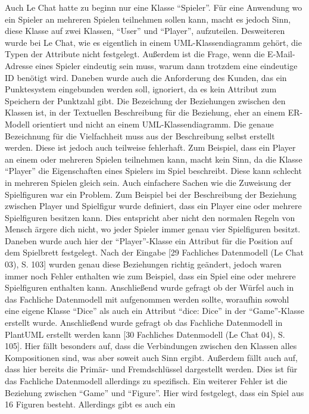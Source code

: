 Auch Le Chat hatte zu beginn nur eine Klasse ``Spieler''. Für eine Anwendung wo ein Spieler an mehreren Spielen teilnehmen sollen kann, macht es jedoch Sinn, diese 
Klasse auf zwei Klassen, ``User'' und ``Player'', aufzuteilen. Desweiteren wurde bei Le Chat, wie es eigentlich in einem UML-Klassendiagramm gehört, die Typen der
Attribute nicht festgelegt. Außerdem ist die Frage, wenn die E-Mail-Adresse eines Spieler eindeutig sein muss, warum dann trotzdem eine eindeutige ID benötigt wird.
Daneben wurde auch die Anforderung des Kunden, das ein Punktesystem eingebunden werden soll, ignoriert, da es kein Attribut zum Speichern der Punktzahl gibt.
Die Bezeichung der Beziehungen zwischen den Klassen ist, in der Textuellen Beschreibung für die Beziehung, eher an einem ER-Modell orientiert und nicht an einem 
UML-Klassendiagramm. Die genaue Bezeichnung für die Vielfachheit muss aus der Beschreibung selbst erstellt werden. Diese ist jedoch auch teilweise fehlerhaft. Zum 
Beispiel, dass ein Player an einem oder mehreren Spielen teilnehmen kann, macht kein Sinn, da die Klasse ``Player'' die Eigenschaften eines Spielers
im Spiel beschreibt. Diese kann schlecht in mehreren Spielen gleich sein. Auch einfachere Sachen wie die Zuweisung der Spielfiguren war ein Problem. Zum Beispiel bei 
der Beschreibung der Beziehung zwischen Player und Spielfigur wurde definiert, dass ein Player eine oder mehrere Spielfiguren besitzen kann. Dies entspricht aber nicht 
den normalen Regeln von Mensch ärgere dich nicht, wo jeder Spieler immer genau vier Spielfiguren besitzt. Daneben wurde auch hier der ``Player''-Klasse ein Attribut
für die Position auf dem Spielbrett festgelegt. Nach der Eingabe [29 Fachliches Datenmodell (Le Chat 03), S. 103] wurden genau diese Beziehungen 
richtig geändert, jedoch waren immer noch Fehler enthalten
wie zum Beispiel, dass ein Spiel eine oder mehrere Spielfiguren enthalten kann. Anschließend wurde gefragt ob der Würfel auch in das Fachliche Datenmodell mit aufgenommen
werden sollte, woraufhin sowohl eine eigene Klasse ``Dice'' als auch ein Attribut ``dice: Dice'' in der ``Game''-Klasse erstellt wurde. Anschließend wurde gefragt ob 
das Fachliche Datenmodell in PlantUML erstellt werden kann [30 Fachliches Datenmodell (Le Chat 04), S. 105]. Hier fällt besonders auf, dass die 
Verbindungen zwischen den Klassen alles Kompositionen sind, was aber soweit
auch Sinn ergibt. Außerdem fällt auch auf, dass hier bereits die Primär- und Fremdschlüssel dargestellt werden. Dies ist für das Fachliche Datenmodell allerdings zu spezifisch.
Ein weiterer Fehler ist die Beziehung zwischen ``Game'' und ``Figure''. Hier wird festgelegt, dass ein Spiel aus 16 Figuren besteht. Allerdings gibt es auch ein 
